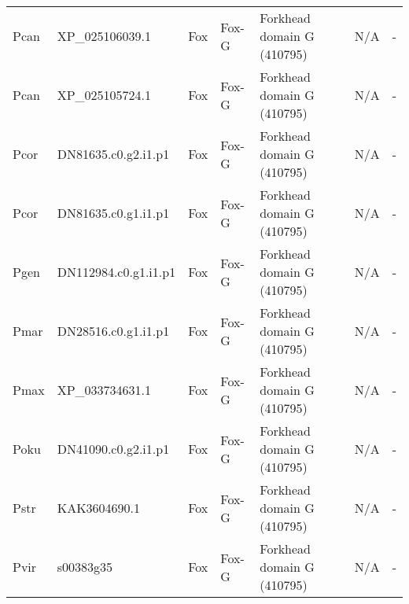 \documentclass[../main.tex]{subfiles}
\begin{document}
\begin{landscape}
\begin{longtable}{lllllll}
		Pcan           & XP\_025106039.1       & Fox            & Fox-G               & Forkhead domain G (410795)                  & N/A                                                                    & -                    \\
		Pcan           & XP\_025105724.1       & Fox            & Fox-G               & Forkhead domain G (410795)                  & N/A                                                                    & -                    \\
		Pcor           & DN81635.c0.g2.i1.p1   & Fox            & Fox-G               & Forkhead domain G (410795)                  & N/A                                                                    & -                    \\
		Pcor           & DN81635.c0.g1.i1.p1   & Fox            & Fox-G               & Forkhead domain G (410795)                  & N/A                                                                    & -                    \\
		Pgen           & DN112984.c0.g1.i1.p1  & Fox            & Fox-G               & Forkhead domain G (410795)                  & N/A                                                                    & -                    \\
		Pmar           & DN28516.c0.g1.i1.p1   & Fox            & Fox-G               & Forkhead domain G (410795)                  & N/A                                                                    & -                    \\
		Pmax           & XP\_033734631.1       & Fox            & Fox-G               & Forkhead domain G (410795)                  & N/A                                                                    & -                    \\
		Poku           & DN41090.c0.g2.i1.p1   & Fox            & Fox-G               & Forkhead domain G (410795)                  & N/A                                                                    & -                    \\
		Pstr           & KAK3604690.1          & Fox            & Fox-G               & Forkhead domain G (410795)                  & N/A                                                                    & -                    \\
		Pvir           & s00383g35             & Fox            & Fox-G               & Forkhead domain G (410795)                  & N/A                                                                    & -                    \\

\end{longtable}
\end{landscape}
\end{document}
